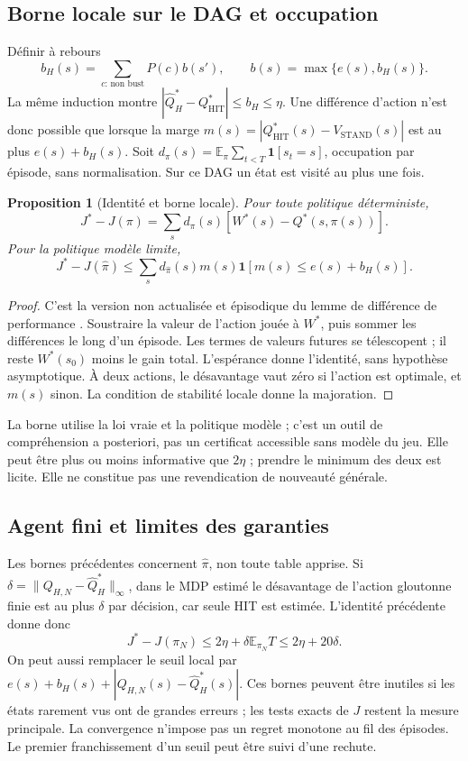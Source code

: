 \documentclass[11pt,a4paper]{article}
\newtheorem{proposition}{Proposition}
\theoremstyle{remark}\newtheorem*{remarque}{Remarque}
\newcommand{\E}{\mathbb E}
\newcommand{\1}{\mathbf 1}
\newcommand{\VS}{V_{\mathrm{STAND}}}
\newcommand{\QH}{Q^*_{\mathrm{HIT}}}
\begin{document}
\subsection{Borne locale sur le DAG et occupation}
Définir à rebours
\[
 b_H(s)=\sum_{c:\,\text{non bust}}P(c)b(s'),\qquad b(s)=\max\{e(s),b_H(s)\}.
\]
La même induction montre $|\widehat Q^*_H-\QH|\le b_H\le\eta$.
Une différence d'action n'est donc possible que lorsque la marge
$m(s)=|\QH(s)-\VS(s)|$ est au plus $e(s)+b_H(s)$.
Soit $d_\pi(s)=\E_\pi\sum_{t<T}\1[s_t=s]$, occupation par épisode,
sans normalisation. Sur ce DAG un état est visité au plus une fois.

\begin{proposition}[Identité et borne locale]
Pour toute politique déterministe,
\[
 J^*-J(\pi)=\sum_s d_\pi(s)[W^*(s)-Q^*(s,\pi(s))].
\]
Pour la politique modèle limite,
\[
 J^*-J(\widehat\pi)\le
 \sum_s d_{\widehat\pi}(s)m(s)\1[m(s)\le e(s)+b_H(s)].
\]
\end{proposition}
\begin{proof}
C'est la version non actualisée et épisodique du lemme de différence de
performance \cite{kakade}. Soustraire la valeur de l'action jouée à $W^*$, puis sommer les différences
le long d'un épisode. Les termes de valeurs futures se télescopent ; il reste
$W^*(s_0)$ moins le gain total. L'espérance donne l'identité, sans hypothèse
asymptotique. À deux actions, le désavantage vaut zéro si l'action est optimale,
et $m(s)$ sinon. La condition de stabilité locale donne la majoration.
\end{proof}
La borne utilise la loi vraie et la politique modèle ; c'est un outil de
compréhension a posteriori, pas un certificat accessible sans modèle du jeu.
Elle peut être plus ou moins informative que $2\eta$ ; prendre le minimum
des deux est licite. Elle ne constitue pas une revendication de nouveauté générale.

\subsection{Agent fini et limites des garanties}
Les bornes précédentes concernent $\widehat\pi$, non toute table apprise.
Si $\delta=\|Q_{H,N}-\widehat Q^*_H\|_\infty$, dans le MDP estimé
le désavantage de l'action gloutonne finie est au plus $\delta$ par décision,
car seule HIT est estimée. L'identité précédente donne donc
\[
 J^*-J(\pi_N)\le 2\eta+\delta\E_{\pi_N}T\le2\eta+20\delta.
\]
On peut aussi remplacer le seuil local par $e(s)+b_H(s)+
|Q_{H,N}(s)-\widehat Q^*_H(s)|$. Ces bornes peuvent être inutiles si les
états rarement vus ont de grandes erreurs ; les tests exacts de $J$ restent
la mesure principale. La convergence n'impose pas un regret monotone au fil
des épisodes. Le premier franchissement d'un seuil peut être suivi d'une rechute.
\end{document}
